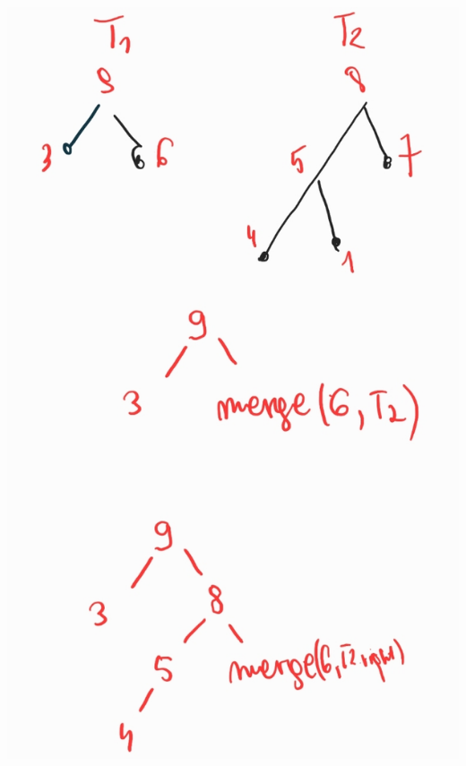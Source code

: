 \documentclass[12pt]{article}
\begin{document}
\includegraphics[scale=0.5]{zad5_1.png}
\end{document}
